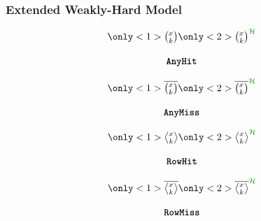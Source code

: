 \begin{frame}
    \frametitle{Extended Weakly-Hard Model}
    \begin{minipage}[c]{0.23\textwidth}
        \centering
        \begin{equation*}
            \begin{matrix}
                \only<1>{\Large \anyhit{}}%
                \only<2>{\Large \anyhit{}^{\textcolor{lqgcolour}{\strat}}}\\
                            \\
                \tAH{}
            \end{matrix}
        \end{equation*}\newline
    \end{minipage}\hfill
    \begin{minipage}[c]{0.23\textwidth}
        \centering
        \begin{equation*}
            \begin{matrix}
                \only<1>{\Large \anymiss{}}%
                \only<2>{\Large \anymiss{}^{\textcolor{lqgcolour}{\strat}}}\\
                            \\
                \tAM{}
            \end{matrix}
        \end{equation*}\newline
    \end{minipage}\hfill
    \begin{minipage}[c]{0.23\textwidth}
        \centering
        \begin{equation*}
            \begin{matrix}
                \only<1>{\Large \rowhit{}}%
                \only<2>{\Large \rowhit{}^{\textcolor{lqgcolour}{\strat}}}\\
                            \\
                \tRH{}
            \end{matrix}
        \end{equation*}\newline
    \end{minipage}\hfill
    \begin{minipage}[c]{0.23\textwidth}
        \centering
        \begin{equation*}
            \begin{matrix}
                \only<1>{\Large \rowmiss{}}%
                \only<2>{\Large \rowmiss{}^{\textcolor{lqgcolour}{\strat}}}\\
                            \\
                \tRM{}
            \end{matrix}
        \end{equation*}\newline
    \end{minipage}

    \centering
\end{frame}


